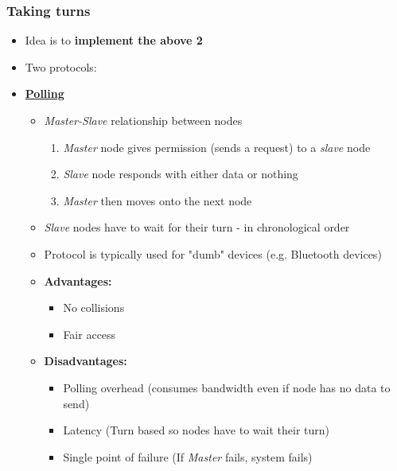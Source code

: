 \documentclass{article}
\begin{document}
\subsubsection{Taking turns}
\begin{itemize}
    \item Idea is to \textbf{implement the above 2}
    \item Two protocols:
    \item \textbf{\underline{Polling}}
    \begin{itemize}
        \item \textit{Master-Slave} relationship between nodes
        \begin{enumerate}
            \item \textit{Master} node gives permission (sends a request) to a \textit{slave} node
            \item \textit{Slave} node responds with either data or nothing
            \item \textit{Master} then moves onto the next node
        \end{enumerate}
        \item \textit{Slave} nodes have to wait for their turn - in chronological order
        \item Protocol is typically used for "dumb" devices (e.g. Bluetooth devices)
        \item \textbf{Advantages:}
        \begin{itemize}
            \item No collisions
            \item Fair access
        \end{itemize}
        \item \textbf{Disadvantages:}
        \begin{itemize}
            \item Polling overhead (consumes bandwidth even if node has no data to send)
            \item Latency (Turn based so nodes have to wait their turn)
            \item Single point of failure (If \textit{Master} fails, system fails)
        \end{itemize}
    \end{itemize}


\end{itemize}
\end{document}
